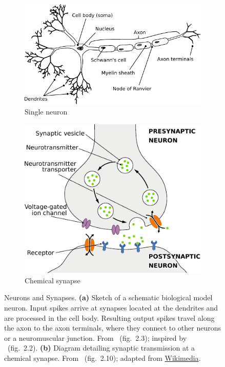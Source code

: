 \documentclass[10pt,letterpaper,oneside]{article}
\begin{document}
\begin{figure}
	\centering
	\begin{subfigure}[c]{0.56\textwidth}%
		\centering%
		\vspace{4.65201mm}%
		\includegraphics{media/neuron_sketch.pdf}%
		\vspace{4.65201mm}%
		\caption{Single neuron}%
		\label{fig:single_neuron}
	\end{subfigure}%
	\begin{subfigure}[c]{0.44\textwidth}%
		\centering%
		\includegraphics{media/synapse_schematic.pdf}%
		\caption{Chemical synapse}%
		\label{fig:chemical}
	\end{subfigure}
	\caption{Neurons and Synapses. \textbf{(a)} Sketch of a schematic biological model neuron. Input spikes arrive at synapses located at the dendrites and are processed in the cell body. Resulting output spikes travel along the axon to the axon terminals, where they connect to other neurons or a neuromuscular junction. From \cite{stoeckel2015design}~(fig.~2.3); inspired by \cite{kandel2012principles}~(fig.~2.2). \textbf{(b)} Diagram detailing synaptic transmission at a chemical synapse. From \cite{stoeckel2015design}~(fig.~2.10); adapted from \href{https://commons.wikimedia.org/wiki/File:SynapseSchematic_en.svg}{Wikimedia}.}
\end{figure}
\end{document}
